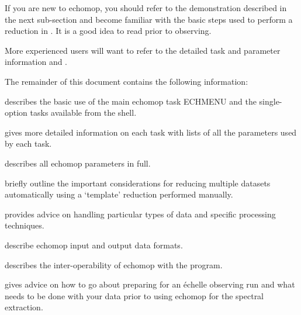 If you are new to {\sc echomop}, you should refer to the demonstration
described in the next sub-section and become familiar with the basic
steps used to perform a reduction in
\@.
It is a good idea to read
 prior to observing.

More experienced users will want to refer to the detailed task and parameter
information
and \@.

The remainder of this document contains the following information:

 describes the basic use of the main
{\sc echomop} task ECHMENU and the single-option tasks available from the shell.

 gives more detailed information on each task
with lists of all the parameters used by each task.

describes all {\sc echomop} parameters in full.

 briefly
outline the important considerations for reducing multiple datasets
automatically using a `template' reduction performed manually.

provides advice on handling particular types of data and specific processing
techniques.

describe {\sc echomop} input and output data formats.

describes the inter-operability of
{\sc echomop} with the   program.

 gives advice on how to go about
preparing for an \'{e}chelle observing run and what needs to be done
with your data prior to using {\sc echomop} for the spectral extraction.

